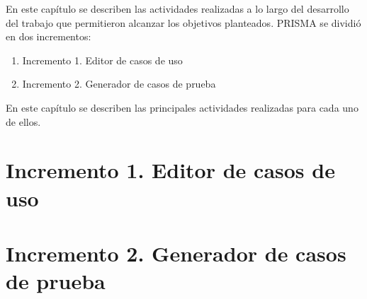 	En este capítulo se describen las actividades realizadas a lo largo del desarrollo del trabajo que permitieron alcanzar los objetivos planteados. PRISMA se dividió en dos incrementos:
	
	\begin{enumerate}
		\item Incremento 1. Editor de casos de uso
		\item Incremento 2. Generador de casos de prueba
	\end{enumerate}
	
	 En este capítulo se describen las principales actividades realizadas para cada uno de ellos.
	
	\section{Incremento 1. Editor de casos de uso}
	
	\section{Incremento 2. Generador de casos de prueba}
	

	
	
	
	